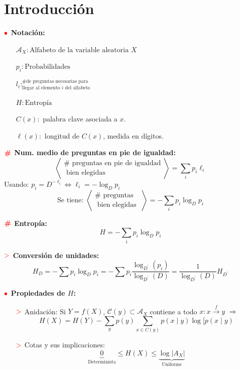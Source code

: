 \documentclass[%
 reprint,
 amsmath,amssymb,
 aps,
]{revtex4-1}
\begin{document}
\section{Introducción}

\textbf{$\color{red}{\bullet}$ Notación:}

\begin{itemize}
  \item[] $\mathcal{A}_X : \text{Alfabeto de la variable aleatoria $X$}$
  \item[] $p_i: \text{Probabilidades}$
  \item[] $l_i: ^\text{\# de preguntas necesarias para }_\text{llegar al elemento $i$ del alfabeto}$
  \item[] $H: \text{Entropía} $
  \item[] $C(x):$ palabra clave asociada a $x .$
  \item[] $\ell(x):$ longitud de $C(x)$, medida en dígitos. 
\end{itemize}

\textbf{$\color{red}{\textbf{\#}}$ Num. medio de preguntas en pie de igualdad:}
$$
\left\langle\begin{array}{c}
\# \text { preguntas en pie de igualdad} \\
\text { bien elegidas }
\end{array}\right\rangle=\sum_{i} p_{i} \ell_{i}
$$
Usando: $
p_{i}=D^{-\ell_{i}}
\Leftrightarrow
\ell_{i}=-\log _{D} p_{i}
$
$$
\text{Se tiene: }
\left\langle\begin{array}{c}
\# \text { preguntas } \\
\text { bien elegidas }
\end{array}\right\rangle=-\sum_{i} p_{i} \log _{D} p_{i}
$$

\textbf{$\color{red}{\textbf{\#}}$ Entropía:}
$$
H=-\sum_{i} p_{i} \log _{D} p_{i}
$$

\textbf{$\textcolor{red}{\mathbf{>}}$ Conversión de unidades:}
$$
H_{D}=-\sum p_{i} \log _{D} p_{i}=-\sum p_{i} \frac{\log _{D^{\prime}}\left(p_{i}\right)}{\log _{D^{\prime}}(D)}=\frac{1}{\log _{D^{\prime}}(D)} H_{D^{\prime}}
$$

\textbf{$\color{red}{\bullet}$ Propiedades de $H$:}
\begin{enumerate}
  \item[$\textcolor{red}{\mathbf{>}}$] Anidación: 
  Si $Y=f(X)$, $\mathcal{C}(y) \subset \mathcal{A}_{X}$ contiene a todo $x:x \stackrel{f}{\rightarrow} y$ 
  $\Rightarrow$
  $$
  H(X)=H(Y)-\sum_{y} p(y) \sum_{x \in C(y)} p(x \mid y) \log [p(x \mid y)
  $$
  \item[$\textcolor{red}{\mathbf{>}}$] Cotas y sus implicaciones:
  $$
  \underbrace{0}_{\text{Determinista}} \leq H(X)
  \leq \underbrace{\log|A_X|}_{\text{Uniforme}}
  $$
\end{enumerate}
\end{document}
